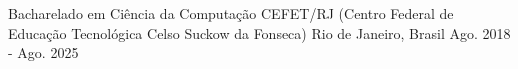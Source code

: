 

\begin{cventries}

  \cventry
    {Bacharelado em Ciência da Computação} %
    {CEFET/RJ (Centro Federal de Educação Tecnológica Celso Suckow da Fonseca)} %
    {Rio de Janeiro, Brasil} %
    {Ago. 2018 - Ago. 2025} %
    {}
\end{cventries}
